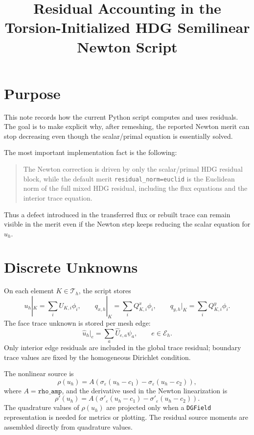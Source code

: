 \documentclass[11pt]{article}
\title{Residual Accounting in the Torsion-Initialized HDG Semilinear Newton Script}
\author{}
\date{}
\newcommand{\uhat}{\widehat u}
\newcommand{\Th}{\mathcal T_h}
\newcommand{\Eh}{\mathcal E_h}
\begin{document}
\maketitle

\section{Purpose}

This note records how the current Python script
 computes and
uses residuals.  The goal is to make explicit why, after remeshing, the
reported Newton merit can stop decreasing even though the scalar/primal
equation is essentially solved.

The most important implementation fact is the following:
\begin{quote}
The Newton correction is driven by only the scalar/primal HDG residual
block, while the default merit \texttt{residual\_norm=euclid} is the
Euclidean norm of the full mixed HDG residual, including the flux
equations and the interior trace equation.
\end{quote}
Thus a defect introduced in the transferred flux or rebuilt trace can
remain visible in the merit even if the Newton step keeps reducing the
scalar equation for \(u_h\).

\section{Discrete Unknowns}

On each element \(K \in \Th\), the script stores
\[
  u_h|_K = \sum_i U_{K,i}\phi_i,
  \qquad
  q_{x,h}|_K = \sum_i Q^x_{K,i}\phi_i,
  \qquad
  q_{y,h}|_K = \sum_i Q^y_{K,i}\phi_i.
\]
The face trace unknown is stored per mesh edge:
\[
  \uhat_h|_e = \sum_a \widehat U_{e,a}\psi_a,
  \qquad e \in \Eh.
\]
Only interior edge residuals are included in the global trace residual;
boundary trace values are fixed by the homogeneous Dirichlet condition.

The nonlinear source is
\[
  \rho(u_h) =
  A\left(
    \sigma_{\varepsilon}(u_h-c_1)
    -
    \sigma_{\varepsilon}(u_h-c_2)
  \right),
\]
where \(A=\texttt{rho\_amp}\), and the derivative used in the Newton
linearization is
\[
  \rho'(u_h) =
  A\left(
    \sigma'_{\varepsilon}(u_h-c_1)
    -
    \sigma'_{\varepsilon}(u_h-c_2)
  \right).
\]
The quadrature values of \(\rho(u_h)\) are projected only when a
\texttt{DGField} representation is needed for metrics or plotting.  The
residual source moments are assembled directly from quadrature values.
\end{document}
